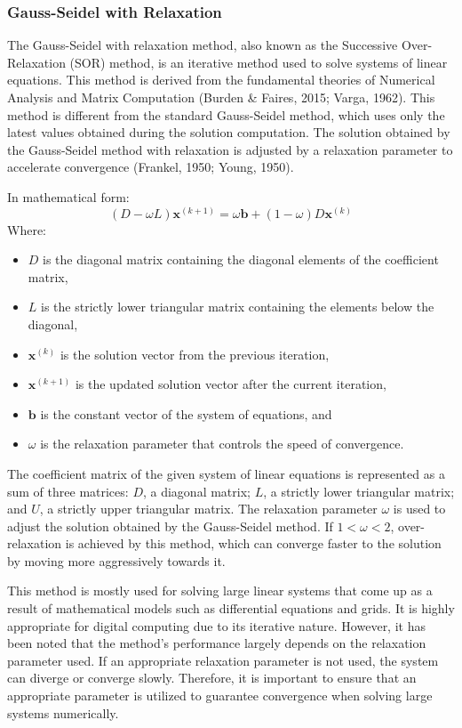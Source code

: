 \documentclass[11pt]{article}
\begin{document}
\subsubsection{Gauss-Seidel with Relaxation}
The Gauss-Seidel with relaxation method, also known as the Successive Over-Relaxation (SOR) method, is an iterative method used to solve systems of linear equations. This method is derived from the fundamental theories of Numerical Analysis and Matrix Computation (Burden \& Faires, 2015; Varga, 1962). This method is different from the standard Gauss-Seidel method, which uses only the latest values obtained during the solution computation. The solution obtained by the Gauss-Seidel method with relaxation is adjusted by a relaxation parameter to accelerate convergence (Frankel, 1950; Young, 1950).

In mathematical form:
$$ (D - \omega L)\mathbf{x}^{(k+1)} = \omega \mathbf{b} + (1 - \omega)D\mathbf{x}^{(k)} $$
Where:
\begin{itemize}
    \item $D$ is the diagonal matrix containing the diagonal elements of the coefficient matrix,
    \item $L$ is the strictly lower triangular matrix containing the elements below the diagonal,
    \item $\mathbf{x}^{(k)}$ is the solution vector from the previous iteration,
    \item $\mathbf{x}^{(k+1)}$ is the updated solution vector after the current iteration,
    \item $\mathbf{b}$ is the constant vector of the system of equations, and
    \item $\omega$ is the relaxation parameter that controls the speed of convergence.
\end{itemize}

The coefficient matrix of the given system of linear equations is represented as a sum of three matrices: $D$, a diagonal matrix; $L$, a strictly lower triangular matrix; and $U$, a strictly upper triangular matrix. The relaxation parameter $\omega$ is used to adjust the solution obtained by the Gauss-Seidel method. If $1 < \omega < 2$, over-relaxation is achieved by this method, which can converge faster to the solution by moving more aggressively towards it.

This method is mostly used for solving large linear systems that come up as a result of mathematical models such as differential equations and grids. It is highly appropriate for digital computing due to its iterative nature. However, it has been noted that the method's performance largely depends on the relaxation parameter used. If an appropriate relaxation parameter is not used, the system can diverge or converge slowly. Therefore, it is important to ensure that an appropriate parameter is utilized to guarantee convergence when solving large systems numerically.
\end{document}
